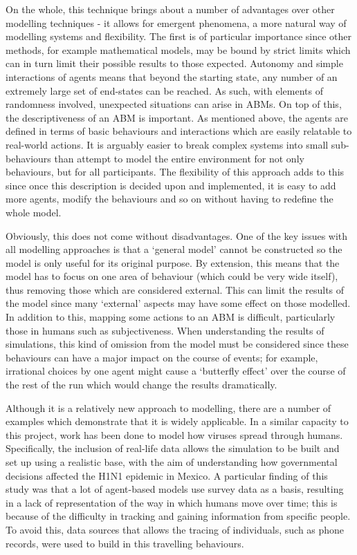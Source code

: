 \documentclass[]{report}
\begin{document}
On the whole, this technique brings about a number of advantages over other modelling techniques - it allows for emergent phenomena, a more natural way of modelling systems and flexibility\cite{ABMMethTech}. The first is of particular importance since other methods, for example mathematical models, may be bound by strict limits which can in turn limit their possible results to those expected. Autonomy and simple interactions of agents means that beyond the starting state, any number of an extremely large set of end-states can be reached. As such, with elements of randomness involved, unexpected situations can arise in ABMs. On top of this, the descriptiveness of an ABM is important. As mentioned above, the agents are defined in terms of basic behaviours and interactions which are easily relatable to real-world actions. It is arguably easier to break complex systems into small sub-behaviours than attempt to model the entire environment for not only behaviours, but for all participants. The flexibility of this approach adds to this since once this description is decided upon and implemented, it is easy to add more agents, modify the behaviours and so on without having to redefine the whole model.

Obviously, this does not come without disadvantages. One of the key issues with all modelling approaches is that a `general model' cannot be constructed so the model is only useful for its original purpose\cite{UCL-ABM}. By extension, this means that the model has to focus on one area of behaviour (which could be very wide itself), thus removing those which are considered external. This can limit the results of the model since many `external' aspects may have some effect on those modelled. In addition to this, mapping some actions to an ABM is difficult, particularly those in humans such as subjectiveness\cite{ABMMethTech}. When understanding the results of simulations, this kind of omission from the model must be considered since these behaviours can have a major impact on the course of events; for example, irrational choices by one agent might cause a `butterfly effect' over the course of the rest of the run which would change the results dramatically.

Although it is a relatively new approach to modelling, there are a number of examples which demonstrate that it is widely applicable. In a similar capacity to this project, work has been done to model how viruses spread through humans\cite{ABM-IEEE}. Specifically, the inclusion of real-life data allows the simulation to be built and set up using a realistic base, with the aim of understanding how governmental decisions affected the H1N1 epidemic in Mexico. A particular finding of this study was that a lot of agent-based models use survey data as a basis, resulting in a lack of representation of the way in which humans move over time; this is because of the difficulty in tracking and gaining information from specific people. To avoid this, data sources that allows the tracing of individuals, such as phone records, were used to build in this travelling behaviours.
\end{document}
